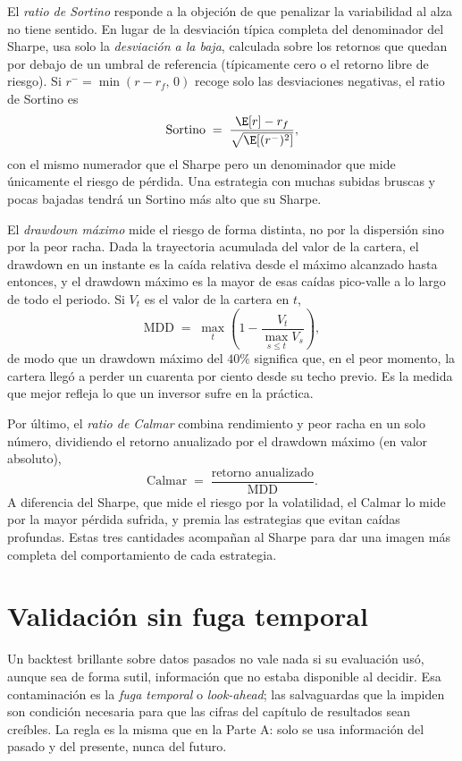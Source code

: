 El \emph{ratio de Sortino} responde a la objeción de que penalizar la variabilidad al alza no tiene sentido. En lugar de la desviación típica completa del denominador del Sharpe, usa solo la \emph{desviación a la baja}, calculada sobre los retornos que quedan por debajo de un umbral de referencia (típicamente cero o el retorno libre de riesgo). Si $r^- = \min(r - r_f,\, 0)$ recoge solo las desviaciones negativas, el ratio de Sortino es
\[
\mathrm{Sortino} \;=\; \frac{\E[r] - r_f}{\sqrt{\E[(r^-)^2]}},
\]
con el mismo numerador que el Sharpe pero un denominador que mide únicamente el riesgo de pérdida. Una estrategia con muchas subidas bruscas y pocas bajadas tendrá un Sortino más alto que su Sharpe.

El \emph{drawdown máximo} mide el riesgo de forma distinta, no por la dispersión sino por la peor racha. Dada la trayectoria acumulada del valor de la cartera, el drawdown en un instante es la caída relativa desde el máximo alcanzado hasta entonces, y el drawdown máximo es la mayor de esas caídas pico-valle a lo largo de todo el periodo. Si $V_t$ es el valor de la cartera en $t$,
\[
\mathrm{MDD} \;=\; \max_{t}\left(1 - \frac{V_t}{\max_{s \le t} V_s}\right),
\]
de modo que un drawdown máximo del $40\%$ significa que, en el peor momento, la cartera llegó a perder un cuarenta por ciento desde su techo previo. Es la medida que mejor refleja lo que un inversor sufre en la práctica.

Por último, el \emph{ratio de Calmar} combina rendimiento y peor racha en un solo número, dividiendo el retorno anualizado por el drawdown máximo (en valor absoluto),
\[
\mathrm{Calmar} \;=\; \frac{\text{retorno anualizado}}{\mathrm{MDD}}.
\]
A diferencia del Sharpe, que mide el riesgo por la volatilidad, el Calmar lo mide por la mayor pérdida sufrida, y premia las estrategias que evitan caídas profundas. Estas tres cantidades acompañan al Sharpe para dar una imagen más completa del comportamiento de cada estrategia.

\section{Validación sin fuga temporal}
\label{sec:cpcv}

Un backtest brillante sobre datos pasados no vale nada si su evaluación usó, aunque sea de forma sutil, información que no estaba disponible al decidir. Esa contaminación es la \emph{fuga temporal} o \emph{look-ahead}; las salvaguardas que la impiden son condición necesaria para que las cifras del capítulo de resultados sean creíbles. La regla es la misma que en la Parte A: solo se usa información del pasado y del presente, nunca del futuro.

